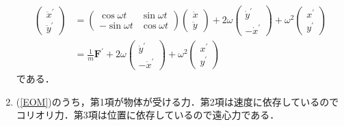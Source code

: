 \documentclass[a4paper,pdflatex,ja=standard]{bxjsarticle}
\begin{document}
\begin{enumerate}
\begin{align}
\begin{pmatrix}
      \ddot{x}^{\prime} \\
      \ddot{y}^{\prime}
    \end{pmatrix}
    &=
    \begin{pmatrix}
      \cos\omega t & \sin\omega t \\
      -\sin\omega t & \cos\omega t
    \end{pmatrix}
    \begin{pmatrix}
      \ddot{x} \\
      \ddot{y}
    \end{pmatrix}
    +
    2\omega
    \begin{pmatrix}
      \dot{y}^{\prime} \\
      -\dot{x}^{\prime}
    \end{pmatrix}
    +
    \omega^2
    \begin{pmatrix}
      x^{\prime} \\
      y^{\prime}
    \end{pmatrix}
    \nonumber
    \\
    &=
    \frac{1}{m}
    \bm{F}^{\prime}
    +
    2\omega
    \begin{pmatrix}
      \dot{y}^{\prime} \\
      -\dot{x}^{\prime}
    \end{pmatrix}
    +
    \omega^2
    \begin{pmatrix}
      x^{\prime} \\
      y^{\prime}
    \end{pmatrix}
    \label{EOM}
  \end{align}
  である．

  \item 
  (\ref{EOM})のうち，第1項が物体が受ける力．第2項は速度に依存しているのでコリオリ力．第3項は位置に依存しているので遠心力である．


\end{enumerate}
\end{document}
